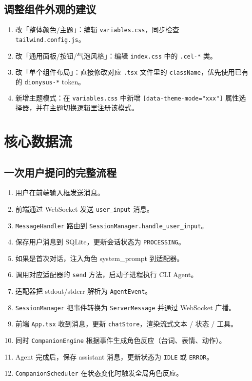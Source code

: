 \documentclass[12pt,a4paper]{article}
\begin{document}
\subsection{调整组件外观的建议}

\begin{enumerate}[leftmargin=2em]
  \item 改「整体颜色/主题」：编辑 \texttt{variables.css}，同步检查 \texttt{tailwind.config.js}。
  \item 改「通用面板/按钮/气泡风格」：编辑 \texttt{index.css} 中的 \texttt{.cel-*} 类。
  \item 改「单个组件布局」：直接修改对应 \texttt{.tsx} 文件里的 \texttt{className}，优先使用已有的 \texttt{dionysus-*} token。
  \item 新增主题模式：在 \texttt{variables.css} 中新增 \texttt{[data-theme-mode="xxx"]} 属性选择器，并在主题切换逻辑里注册该模式。
\end{enumerate}

\section{核心数据流}

\subsection{一次用户提问的完整流程}

\begin{enumerate}[leftmargin=2em]
  \item 用户在前端输入框发送消息。
  \item 前端通过 WebSocket 发送 \texttt{user\_input} 消息。
  \item \texttt{MessageHandler} 路由到 \texttt{SessionManager.handle\_user\_input}。
  \item 保存用户消息到 SQLite，更新会话状态为 \texttt{PROCESSING}。
  \item 如果是首次对话，注入角色 system\_prompt 到适配器。
  \item 调用对应适配器的 \texttt{send} 方法，启动子进程执行 CLI Agent。
  \item 适配器把 stdout/stderr 解析为 \texttt{AgentEvent}。
  \item \texttt{SessionManager} 把事件转换为 \texttt{ServerMessage} 并通过 WebSocket 广播。
  \item 前端 \texttt{App.tsx} 收到消息，更新 \texttt{chatStore}，渲染流式文本 / 状态 / 工具。
  \item 同时 \texttt{CompanionEngine} 根据事件生成角色反应（台词、表情、动作）。
  \item Agent 完成后，保存 assistant 消息，更新状态为 \texttt{IDLE} 或 \texttt{ERROR}。
  \item \texttt{CompanionScheduler} 在状态变化时触发全局角色反应。
\end{enumerate}
\end{document}
